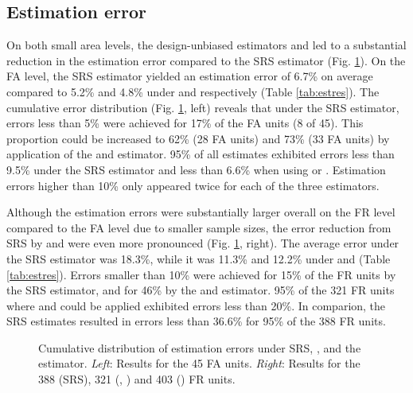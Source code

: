 \subsection{Estimation error}
\label{sec:esterr}

On both small area levels, the design-unbiased estimators \psmall{} and \extpsynth{} led to a substantial reduction in the estimation error compared to the SRS estimator (Fig. \ref{fig:disterrors}). On the FA level, the SRS estimator yielded an estimation error of 6.7\% on average compared to 5.2\% and 4.8\% under \extpsynth{} and \psmall{} respectively (Table \ref{tab:estres}). The cumulative error distribution (Fig. \ref{fig:disterrors}, left) reveals that under the SRS estimator, errors less than 5\% were achieved for 17\% of the FA units (8 of 45). This proportion could be increased to 62\% (28 FA units) and 73\% (33 FA units) by application of the \psmall{} and \extpsynth{} estimator. 95\% of all estimates exhibited errors less than 9.5\% under the SRS estimator and less than 6.6\% when using \psmall{} or \extpsynth{}. Estimation errors higher than 10\% only appeared twice for each of the three estimators.\par
Although the estimation errors were substantially larger overall on the FR level compared to the FA level due to smaller sample sizes, the error reduction from SRS by \psmall{} and \extpsynth{} were even more pronounced (Fig. \ref{fig:disterrors}, right). The average error under the SRS estimator was 18.3\%, while it was 11.3\% and 12.2\% under \psmall{} and \extpsynth{} (Table \ref{tab:estres}). Errors smaller than 10\% were achieved for 15\% of the FR units by the SRS estimator, and for 46\% by the \psmall{} and \psynth{} estimator. 95\% of the 321 FR units where \psmall{} and \extpsynth{} could be applied exhibited errors less than 20\%. In comparion, the SRS estimates resulted in errors less than 36.6\% for 95\% of the 388 FR units.

\begin{figure}[H]
	\centering
	\caption{Cumulative distribution of estimation errors under SRS, \psmall{}, \extpsynth{} and the \psynth{} estimator. \textit{Left}: Results for the 45 FA units. \textit{Right}: Results for the 388 (SRS), 321 (\psmall{}, \extpsynth{}) and 403 (\psynth{}) FR units.}
	\label{fig:disterrors}
\end{figure}

